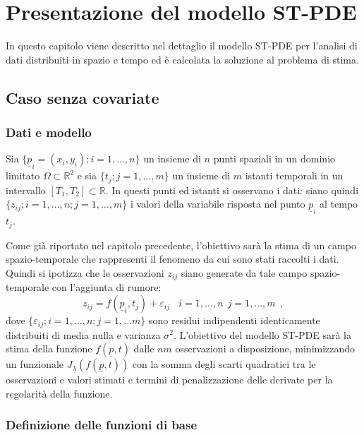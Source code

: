 \documentclass[a4paper,11pt,twoside,openright]{book}							%
\begin{document}
\chapter{Presentazione del modello ST-PDE}
\label{cap:modello}
In questo capitolo viene descritto nel dettaglio il modello ST-PDE per l'analisi di dati distribuiti in spazio e tempo ed è calcolata la soluzione al problema di stima.


\section{Caso senza covariate}

\subsection{Dati e modello}

Sia $\{\underline p_i = (x_i,y_i); i=1, \ldots , n\}$ un insieme di $n$ punti spaziali in un dominio limitato $\Omega \subset \mathbb R^2$ e sia $\{t_j ; j=1, \ldots , m\}$ un insieme di $m$ istanti temporali in un intervallo $[T_1,T_2]\subset \mathbb R$. In questi punti ed istanti si osservano i dati: siano quindi $\{ z_{ij};i=1, \ldots , n; j=1, \ldots , m \}$ i valori della variabile risposta nel punto $\underline p_i$ al tempo $t_j$.

Come già riportato nel capitolo precedente, l'obiettivo sarà la stima di un campo spazio-temporale che rappresenti il fenomeno da cui sono stati raccolti i dati. Quindi si ipotizza che le osservazioni $z_{ij}$ siano generate da tale campo spazio-temporale con l'aggiunta di rumore:
\begin{equation}
\label{eq:modellobase}
z_{ij}=f(\underline p_i,t_j)+\varepsilon_{ij}\ \ \ \ i = 1,\ldots,n\ \ j=1,\ldots,m \ \ ,
\end{equation}
dove $\{ \varepsilon_{ij}; i = 1,\ldots ,n; j=1,\ldots m\}$ sono residui indipendenti identicamente distribuiti di media nulla e varianza $\sigma^2$. L'obiettivo del modello ST-PDE sarà la stima della funzione $f(\underline p,t)$ dalle $nm$ osservazioni a disposizione, minimizzando un funzionale $J_{\underline \lambda }(f(\underline p,t))$ con la somma degli scarti quadratici tra le osservazioni e valori stimati e termini di penalizzazione delle derivate per la regolarità della funzione.



\subsection{Definizione delle funzioni di base}
\label{subs:basi}
\end{document}
